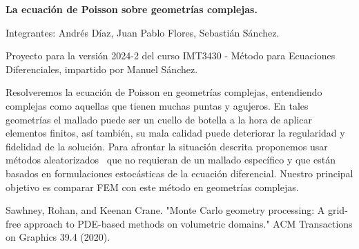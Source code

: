 \documentclass{article}
\begin{document}
\begin{center}
{\bfseries\Large
  La ecuación de Poisson sobre geometrías complejas.
}

\vspace{0.25cm}

Integrantes: Andrés Díaz, Juan Pablo Flores, Sebastián Sánchez.

\vspace{0.5cm}

{\scriptsize
Proyecto para la versión 2024-2 del curso 
IMT3430 - Método para Ecuaciones Diferenciales, impartido por Manuel Sánchez.
}
\end{center}

Resolveremos la ecuación de Poisson en geometrías complejas, entendiendo
complejas como aquellas que tienen muchas puntas y agujeros.
En tales geometrías el mallado puede ser un cuello de botella a la hora
de aplicar elementos finitos, así también, su mala calidad puede
deteriorar la regularidad y fidelidad de la solución.
Para afrontar la situación descrita proponemos usar métodos 
aleatorizados~\cite{sawhney2020}
que no requieran de un mallado específico y que están basados en
formulaciones estocásticas de la ecuación diferencial.
Nuestro principal objetivo es comparar FEM con este método 
en geometrías complejas.

\begin{thebibliography}{9}
Sawhney, Rohan, and Keenan Crane. "Monte Carlo geometry processing: A grid-free approach to PDE-based methods on volumetric domains." ACM Transactions on Graphics 39.4 (2020).
\end{thebibliography}
\end{document}
